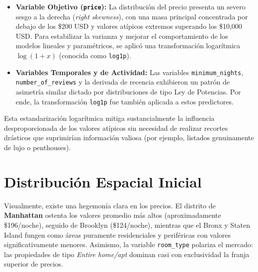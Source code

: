 \begin{itemize}
    \item \textbf{Variable Objetivo (\texttt{price}):} La distribución del precio presenta un severo sesgo a la derecha (\textit{right skewness}), con una masa principal concentrada por debajo de los \$200 USD y valores atípicos extremos superando los \$10,000 USD. Para estabilizar la varianza y mejorar el comportamiento de los modelos lineales y paramétricos, se aplicó una transformación logarítmica $\log(1+x)$ (conocida como \texttt{log1p}).
    \item \textbf{Variables Temporales y de Actividad:} Las variables \texttt{minimum\_nights}, \texttt{number\_of\_reviews} y la derivada de recencia exhibieron un patrón de asimetría similar dictado por distribuciones de tipo Ley de Potencias. Por ende, la transformación \texttt{log1p} fue también aplicada a estos predictores.
\end{itemize}

Esta estandarización logarítmica mitiga sustancialmente la influencia desproporcionada de los valores atípicos sin necesidad de realizar recortes drásticos que suprimirían información valiosa (por ejemplo, listados genuinamente de lujo o penthouses).

\section{Distribución Espacial Inicial}
Visualmente, existe una hegemonía clara en los precios. El distrito de \textbf{Manhattan} ostenta los valores promedio más altos (aproximadamente \$196/noche), seguido de Brooklyn (\$124/noche), mientras que el Bronx y Staten Island fungen como áreas puramente residenciales y periféricas con valores significativamente menores. Asimismo, la variable \texttt{room\_type} polariza el mercado: las propiedades de tipo \textit{Entire home/apt} dominan casi con exclusividad la franja superior de precios.
